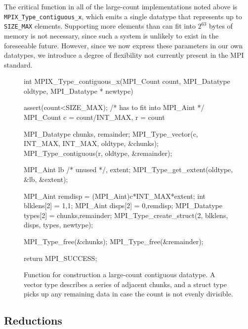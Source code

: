 The critical function in all of the large-count implementations noted above
is \texttt{MPIX\_Type\_contiguous\_x}, which emits a single datatype that
represents up to \texttt{SIZE\_MAX} elements.
Supporting more elements than can fit into $2^{63}$ bytes of memory is
not necessary, since such a system is unlikely to exist in the foreseeable future.
However, since we now express these parameters in our own datatypes, we introduce
a degree of flexibility not currently present in the MPI standard.



\begin{figure}
\begin{code}
int MPIX_Type_contiguous_x(MPI_Count count, 
                           MPI_Datatype oldtype, 
                           MPI_Datatype * newtype)
{
    assert(count<SIZE_MAX); /* has to fit into MPI_Aint */
    MPI_Count c = count/INT_MAX, r = count%

    MPI_Datatype chunks, remainder;
    MPI_Type_vector(c, INT_MAX, INT_MAX, oldtype, &chunks);
    MPI_Type_contiguous(r, oldtype, &remainder);

    MPI_Aint lb /* unused */, extent;
    MPI_Type_get_extent(oldtype, &lb, &extent);

    MPI_Aint remdisp          = (MPI_Aint)c*INT_MAX*extent;
    int blklens[2]            = {1,1};
    MPI_Aint disps[2]         = {0,remdisp};
    MPI_Datatype types[2]     = {chunks,remainder};
    MPI_Type_create_struct(2,
    	blklens, disps, types, newtype);

    MPI_Type_free(&chunks);
    MPI_Type_free(&remainder);

    return MPI_SUCCESS;
}
\end{code}
\label{code:type_contig_x}
\caption{Function for construction a large-count contiguous datatype.
A vector type describes a series of adjacent chunks, and a struct type picks up
any remaining data in case the count is not evenly divisible.}
\end{figure}



\subsection{Reductions}
\label{sec:reductions}

